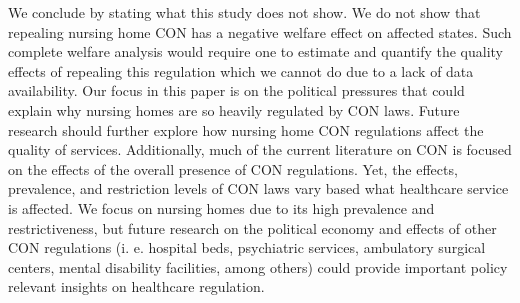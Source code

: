 \documentclass[../Main.tex]{subfiles}
\begin{document}
We conclude by stating what this study does not show. We do not show that repealing nursing home CON has a negative welfare effect on affected states. Such complete welfare analysis would require one to estimate and quantify the quality effects of repealing this regulation which we cannot do due to a lack of data availability. Our focus in this paper is on the political pressures that could explain why nursing homes are so heavily regulated by CON laws. Future research should further explore how nursing home CON regulations affect the quality of services. Additionally, much of the current literature on CON is focused on the effects of the overall presence of CON regulations. Yet, the effects, prevalence, and restriction levels of CON laws vary based what healthcare service is affected. We focus on nursing homes due to its high prevalence and restrictiveness, but future research on the political economy and effects of other CON regulations (i. e. hospital beds, psychiatric services, ambulatory surgical centers, mental disability facilities, among others) could provide important policy relevant insights on healthcare regulation. 
\end{document}
